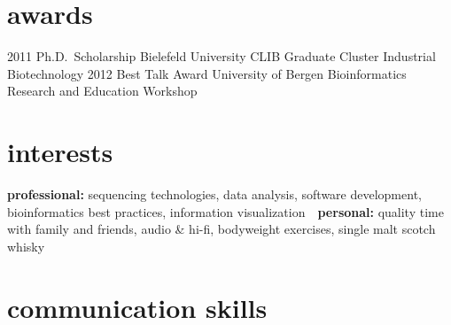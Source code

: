 \documentclass[print]{friggeri-cv}
\begin{document}

\section{awards}

\begin{entrylist}
\entry
{2011}
{Ph.D.\ Scholarship}
{Bielefeld University}
{CLIB Graduate Cluster Industrial Biotechnology}
\entry
{2012}
{Best Talk Award}
{University of Bergen}
{Bioinformatics Research and Education Workshop}
\end{entrylist}


\section{interests}

\textbf{professional:} sequencing technologies, data analysis, software development, bioinformatics best practices, information visualization\ \ \textbf{personal:} quality time with family and friends, audio \& hi-fi, bodyweight exercises, single malt scotch whisky

\newpage
\section{communication skills}
\end{document}
